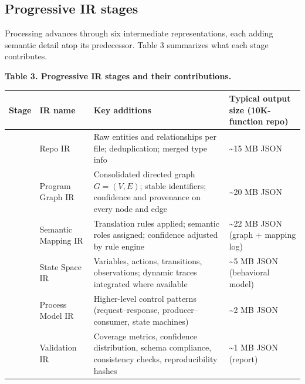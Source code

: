 \documentclass[
]{article}
\newcounter{none} %
\begin{document}
\subsection{Progressive IR stages}\label{progressive-ir-stages-1}

Processing advances through six intermediate representations, each
adding semantic detail atop its predecessor. Table 3 summarizes what
each stage contributes.

\textbf{Table 3. Progressive IR stages and their contributions.}

{\def\LTcaptype{none} %
\begin{longtable}[]{@{}
  >{\raggedright\arraybackslash}p{}
  >{\raggedright\arraybackslash}p{}
  >{\raggedright\arraybackslash}p{}
  >{\raggedright\arraybackslash}p{}@{}}
\toprule\noalign{}
\begin{minipage}[b]{\linewidth}\raggedright
Stage
\end{minipage} & \begin{minipage}[b]{\linewidth}\raggedright
IR name
\end{minipage} & \begin{minipage}[b]{\linewidth}\raggedright
Key additions
\end{minipage} & \begin{minipage}[b]{\linewidth}\raggedright
Typical output size (10K-function repo)
\end{minipage} \\
\midrule\noalign{}
\endhead
\bottomrule\noalign{}
\endlastfoot
1 & Repo IR & Raw entities and relationships per file; deduplication;
merged type info & \textasciitilde15 MB JSON \\
2 & Program Graph IR & Consolidated directed graph \(G=(V,E)\); stable
identifiers; confidence and provenance on every node and edge &
\textasciitilde20 MB JSON \\
3 & Semantic Mapping IR & Translation rules applied; semantic roles
assigned; confidence adjusted by rule engine & \textasciitilde22 MB JSON
(graph + mapping log) \\
4 & State Space IR & Variables, actions, transitions, observations;
dynamic traces integrated where available & \textasciitilde5 MB JSON
(behavioral model) \\
5 & Process Model IR & Higher-level control patterns (request--response,
producer--consumer, state machines) & \textasciitilde2 MB JSON \\
6 & Validation IR & Coverage metrics, confidence distribution, schema
compliance, consistency checks, reproducibility hashes &
\textasciitilde1 MB JSON (report) \\
\end{longtable}
}
\end{document}
